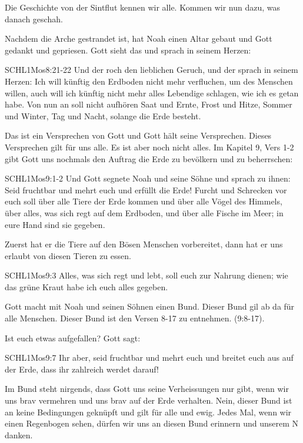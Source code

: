         Die Geschichte von der Sintflut kennen wir alle. Kommen wir nun dazu, was danach geschah.

        Nachdem die Arche gestrandet ist, hat Noah einen Altar gebaut und Gott gedankt und gepriesen. Gott sieht das und sprach in seinem Herzen:
        \begin{bibelquote}{SCHL}{1Mos}{8:21-22}
            Und der  \herr{} roch den lieblichen Geruch, und der \herr{} sprach in seinem Herzen: Ich will künftig den Erdboden nicht mehr verfluchen, um des Menschen willen,  auch will ich künftig nicht mehr alles Lebendige schlagen, wie ich es getan habe. Von nun an soll nicht aufhören Saat und Ernte, Frost und Hitze, Sommer und Winter, Tag und Nacht, solange die Erde besteht.
        \end{bibelquote}
        Das ist ein Versprechen von Gott und Gott hält seine Versprechen. Dieses Versprechen gilt für uns alle.
        Es ist aber noch nicht alles. Im Kapitel 9, Vers 1-2 gibt Gott uns nochmals den Auftrag die Erde zu bevölkern und zu beherrschen:
        \begin{bibelquote}{SCHL}{1Mos}{9:1-2}
            Und Gott segnete Noah und seine Söhne und sprach zu ihnen: Seid fruchtbar und mehrt euch und erfüllt die Erde! Furcht und Schrecken vor euch soll über alle Tiere der Erde kommen und über alle Vögel des Himmels, über alles, was sich regt auf dem Erdboden, und über alle Fische im Meer; in eure Hand sind sie gegeben.
        \end{bibelquote}
        Zuerst hat er die Tiere auf den Bösen Menschen vorbereitet, dann hat er uns erlaubt von diesen Tieren zu essen.
        \begin{bibelquote}{SCHL}{1Mos}{9:3}
            Alles, was sich regt und lebt, soll euch zur Nahrung dienen; wie das grüne Kraut habe ich euch alles gegeben.
        \end{bibelquote}
        Gott macht mit Noah und seinen Söhnen einen Bund. Dieser Bund gil ab da für alle Menschen. Dieser Bund ist den Versen 8-17 zu entnehmen.
        (9:8-17).

        Ist euch etwas aufgefallen? Gott sagt:
        \begin{bibelquote}{SCHL}{1Mos}{9:7}
            Ihr aber, seid fruchtbar und mehrt euch und breitet euch aus auf der Erde, dass ihr zahlreich werdet darauf!
        \end{bibelquote}
        Im Bund steht nirgends, dass Gott uns seine Verheissungen nur gibt, wenn wir uns brav vermehren und uns brav auf der Erde verhalten. Nein, dieser Bund ist an keine Bedingungen geknüpft und gilt für alle und ewig. Jedes Mal, wenn wir einen Regenbogen sehen, dürfen wir uns an diesen Bund erinnern und unserem \herr N danken.


